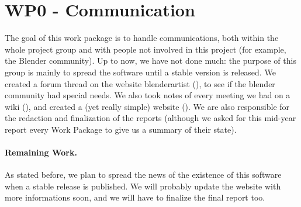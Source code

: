 \section{WP0 - Communication}

The goal of this work package is to handle communications, both within the whole project group and with people not involved in this project (for example, the Blender community). Up to now, we have not done much: the purpose of this group is mainly to spread the software until a stable version is released. We created a forum thread on the website blenderartist (\cite{blenderartist}), to see if the blender community had special needs. We also took notes of every meeting we had on a wiki (\cite{comptesrendus}), and created a (yet really simple) website (\cite{site}). We are also responsible for the redaction and finalization of the reports (although we asked for this mid-year report every Work Package to give us a summary of their state).

\paragraph{Remaining Work.} As stated before, we plan to spread the news of the existence of this software when a stable release is published. We will probably update the website with more informations soon, and we will have to finalize the final report too.
